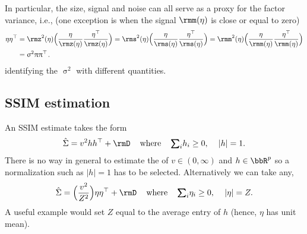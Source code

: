 \documentclass[leqno,12pt]{article}
\begin{document}
{In particular, the size, signal and noise can all serve
as a proxy for the factor variance, i.e., (one exception
is when the signal $\rmm(\eta)$ is close or equal to zero)
\begin{align}
  \eta \eta^\top 
  &= \rmz^2(\eta) \Big( \frac{\eta}{\rmz(\eta)}
   \frac{\eta^\top}{\rmz(\eta)} \Big)
  = \rms^2(\eta) \Big( \frac{\eta}{\rms(\eta)}
   \frac{\eta^\top}{\rms(\eta)} \Big)
  = \rmm^2(\eta) \Big( \frac{\eta}{\rmm(\eta)}
   \frac{\eta^\top}{\rmm(\eta)} \Big) \\
  &= \upsigma^2 \uppi \uppi^\top \s . \notag
\end{align}
identifying the $\upsigma^2$ with different quantities.


\newpage

\subsection{SSIM estimation}
An SSIM estimate takes the form
\begin{align} \label{estmod}
  \hat{\Sigma} = v^2 h h^\top + \rmD
\hspace{0.16in}
\text{where}
\hspace{0.16in}
\tsum_i h_i \ge 0, 
\hspace{0.16in}
|h| = 1.
\end{align}
There is no way in general to estimate the  of 
$v \in (0,\infty)$ and $h \in \bbR^p$ so a normalization such as $|h| =1$
has to be selected. Alternatively we can take any,
\begin{align} \label{estnmod}
  \hat{\Sigma} = \Big(\frac{v^2}{Z^2}\Big)
 \eta \eta^\top + \rmD
\hspace{0.16in}
\text{where}
\hspace{0.16in}
\tsum_i \eta_i \ge 0, 
\hspace{0.16in}
|\eta| = Z.
\end{align}
A useful example would set $Z$ equal to the average
entry of $h$ (hence, $\eta$ has unit mean).


}
\end{document}
